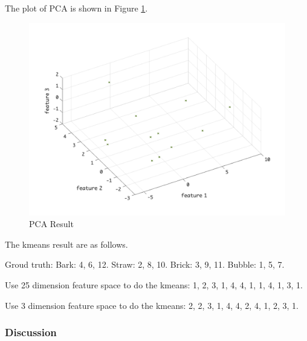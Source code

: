 \documentclass[11pt]{article}
\begin{document}
The plot of PCA is shown in Figure \ref{pca_3d}.
\begin{figure}[!htp]
	\centering
	\includegraphics[scale=0.3]{pca_3d.png}
	\caption{PCA Result}
	\label{pca_3d}
	\end{figure}
\par
The kmeans result are as follows.\par

Groud truth: Bark: 4, 6, 12. Straw: 2, 8, 10. Brick: 3, 9, 11. Bubble: 1, 5, 7.\par
Use 25 dimension feature space to do the kmeans: 1, 2, 3, 1, 4, 4, 1, 1, 4, 1, 3, 1.\par
Use 3 dimension feature space to do the kmeans: 2, 2, 3, 1, 4, 4, 2, 4, 1, 2, 3, 1. \par
\subsubsection{Discussion}
\end{document}

